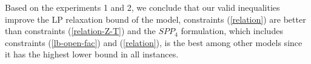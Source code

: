 Based on the experiments 1 and 2, we conclude that our valid inequalities improve the LP relaxation bound of the model, 
constraints (\ref{relation}) are better than  constraints (\ref{relation-Z-T}) and the $SPP_4$ formulation, which includes 
constraints (\ref{lb-open-fac}) and (\ref{relation}), is the best among other models since it has the highest 
lower bound in all instances. 


\qquad

